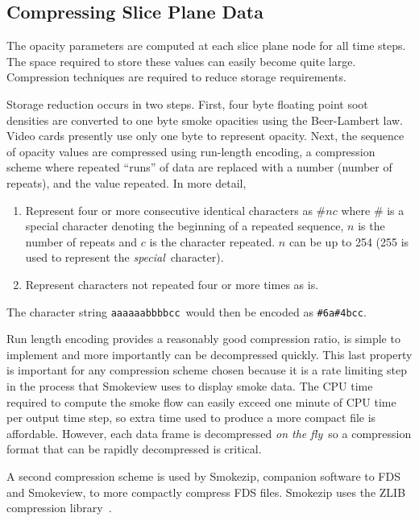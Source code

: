 {%

\subsection{Compressing Slice Plane Data}

The opacity parameters are computed at each slice plane node for all time steps. The space required to store these values can easily become quite large. Compression techniques are required to reduce storage requirements.

Storage reduction occurs in two steps.  First, four byte floating point soot densities are converted to one byte smoke opacities using the Beer-Lambert law.  Video cards presently use only one byte to represent opacity. Next, the sequence of opacity values are compressed using run-length encoding, a compression scheme where repeated ``runs'' of data are replaced with a number (number of repeats), and the value repeated.  In more detail,


\begin{enumerate}
\item Represent four or more consecutive identical characters as $\# n c$ where $\#$ is a special character denoting the beginning
of a repeated sequence, $n$ is the number of repeats and $c$ is the character repeated.  $n$ can be up to 254 (255 is used to
represent the {\em special}\ character). \item Represent characters not repeated four or more times as is.
\end{enumerate}

The character string {\tt aaaaaabbbbcc}\ would then be encoded as {\tt \#6a\#4bcc}.

Run length encoding provides a reasonably good compression ratio, is simple to implement and more importantly can be decompressed quickly. This last property is important for any compression scheme chosen because it is a rate limiting step in the process that Smokeview uses to display smoke data. The CPU time required to compute the smoke flow can easily exceed one minute of CPU time
per output time step, so extra time used to produce a more compact file is affordable. However, each data frame is decompressed {\em on the fly}\ so a compression format that can be rapidly decompressed is critical.

A second compression scheme is used by Smokezip, companion software to FDS and Smokeview, to more compactly compress FDS files.  Smokezip uses the ZLIB compression library~\cite{ZLIB}.

}
